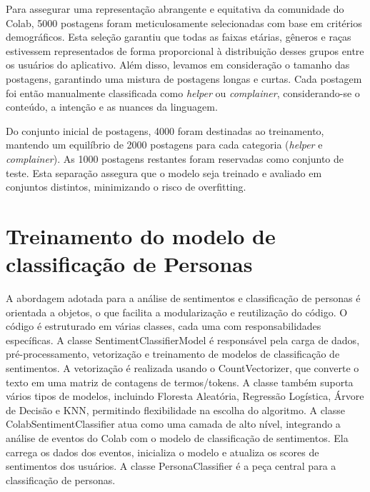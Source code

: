 Para assegurar uma representação abrangente e equitativa da comunidade do Colab, 5000 postagens foram meticulosamente selecionadas com base em critérios demográficos. Esta seleção garantiu que todas as faixas etárias, gêneros e raças estivessem representados de forma proporcional à distribuição desses grupos entre os usuários do aplicativo. Além disso, levamos em consideração o tamanho das postagens, garantindo uma mistura de postagens longas e curtas. Cada postagem foi então manualmente classificada como \textit{helper} ou \textit{complainer}, considerando-se o conteúdo, a intenção e as nuances da linguagem.

Do conjunto inicial de postagens, 4000 foram destinadas ao treinamento, mantendo um equilíbrio de 2000 postagens para cada categoria (\textit{helper} e \textit{complainer}). As 1000 postagens restantes foram reservadas como conjunto de teste. Esta separação assegura que o modelo seja treinado e avaliado em conjuntos distintos, minimizando o risco de overfitting.

\section{Treinamento do modelo de classificação de Personas}

A abordagem adotada para a análise de sentimentos e classificação de personas é orientada a objetos, o que facilita a modularização e reutilização do código. O código é estruturado em várias classes, cada uma com responsabilidades específicas. A classe SentimentClassifierModel é responsável pela carga de dados, pré-processamento, vetorização e treinamento de modelos de classificação de sentimentos. A vetorização é realizada usando o CountVectorizer, que converte o texto em uma matriz de contagens de termos/tokens. A classe também suporta vários tipos de modelos, incluindo Floresta Aleatória, Regressão Logística, Árvore de Decisão e KNN, permitindo flexibilidade na escolha do algoritmo. A classe ColabSentimentClassifier atua como uma camada de alto nível, integrando a análise de eventos do Colab com o modelo de classificação de sentimentos. Ela carrega os dados dos eventos, inicializa o modelo e atualiza os scores de sentimentos dos usuários. A classe PersonaClassifier é a peça central para a classificação de personas.

